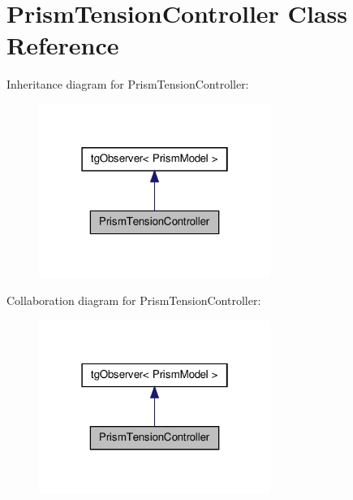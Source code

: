 \hypertarget{class_prism_tension_controller}{\section{Prism\-Tension\-Controller Class Reference}
\label{class_prism_tension_controller}
}


Inheritance diagram for Prism\-Tension\-Controller\-:\nopagebreak
\begin{figure}[H]
\begin{center}
\leavevmode
\includegraphics[width=214pt]{class_prism_tension_controller__inherit__graph}
\end{center}
\end{figure}


Collaboration diagram for Prism\-Tension\-Controller\-:\nopagebreak
\begin{figure}[H]
\begin{center}
\leavevmode
\includegraphics[width=214pt]{class_prism_tension_controller__coll__graph}
\end{center}
\end{figure}
